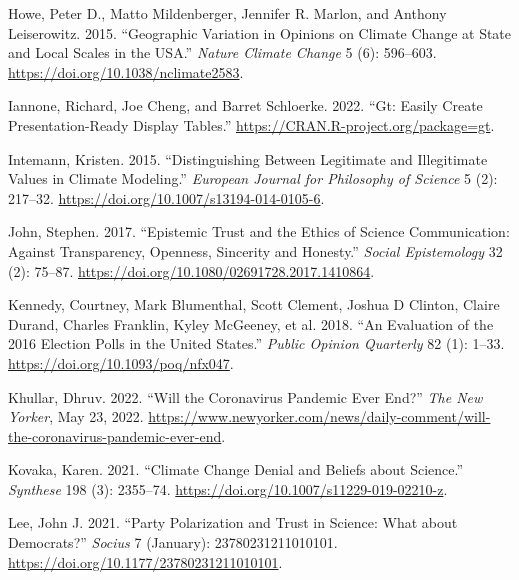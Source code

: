 \documentclass[
  letterpaper,
  DIV=11,
  numbers=noendperiod]{scrartcl}
\newlength{\cslhangindent}
\newlength{\cslentryspacingunit} %
\newenvironment{CSLReferences}[2] %
 {%
  \setlength{\parindent}{0pt}
  \ifodd #1
  \let\oldpar\par
  \def\par{\hangindent=\cslhangindent\oldpar}
  \fi
  \setlength{\parskip}{#2\cslentryspacingunit}
 }%
 {}
\begin{document}
\begin{CSLReferences}{1}{0}
\leavevmode{}%
Howe, Peter D., Matto Mildenberger, Jennifer R. Marlon, and Anthony
Leiserowitz. 2015. {``Geographic Variation in Opinions on Climate Change
at State and Local Scales in the USA.''} \emph{Nature Climate Change} 5
(6): 596--603. \url{https://doi.org/10.1038/nclimate2583}.

\leavevmode{}%
Iannone, Richard, Joe Cheng, and Barret Schloerke. 2022. {``Gt: Easily
Create Presentation-Ready Display Tables.''}
\url{https://CRAN.R-project.org/package=gt}.

\leavevmode{}%
Intemann, Kristen. 2015. {``Distinguishing Between Legitimate and
Illegitimate Values in Climate Modeling.''} \emph{European Journal for
Philosophy of Science} 5 (2): 217--32.
\url{https://doi.org/10.1007/s13194-014-0105-6}.

\leavevmode{}%
John, Stephen. 2017. {``Epistemic Trust and the Ethics of Science
Communication: Against Transparency, Openness, Sincerity and Honesty.''}
\emph{Social Epistemology} 32 (2): 75--87.
\url{https://doi.org/10.1080/02691728.2017.1410864}.

\leavevmode{}%
Kennedy, Courtney, Mark Blumenthal, Scott Clement, Joshua D Clinton,
Claire Durand, Charles Franklin, Kyley McGeeney, et al. 2018. {``An
Evaluation of the 2016 Election Polls in the United States.''}
\emph{Public Opinion Quarterly} 82 (1): 1--33.
\url{https://doi.org/10.1093/poq/nfx047}.

\leavevmode{}%
Khullar, Dhruv. 2022. {``Will the Coronavirus Pandemic Ever End?''}
\emph{The New Yorker}, May 23, 2022.
\url{https://www.newyorker.com/news/daily-comment/will-the-coronavirus-pandemic-ever-end}.

\leavevmode{}%
Kovaka, Karen. 2021. {``Climate Change Denial and Beliefs about
Science.''} \emph{Synthese} 198 (3): 2355--74.
\url{https://doi.org/10.1007/s11229-019-02210-z}.

\leavevmode{}%
Lee, John J. 2021. {``Party Polarization and Trust in Science: What
about Democrats?''} \emph{Socius} 7 (January): 23780231211010101.
\url{https://doi.org/10.1177/23780231211010101}.


\end{CSLReferences}
\end{document}
